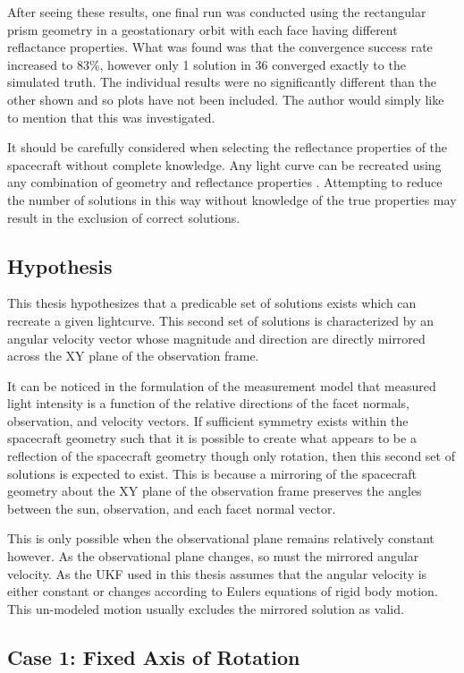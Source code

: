After seeing these results, one final run was conducted using the rectangular prism geometry in a geostationary orbit with each face having different reflactance properties. What was found was that the convergence success rate increased to 83\%, however only 1 solution in 36 converged exactly to the simulated truth. The individual results were no significantly different than the other shown and so plots have not been included. The author would simply like to mention that this was investigated.

It should be carefully considered when selecting the reflectance properties of the spacecraft without complete knowledge. Any light curve can be recreated using any combination of geometry and reflectance properties \cite{Spin_Direction}. Attempting to reduce the number of solutions in this way without knowledge of the true properties may result in the exclusion of correct solutions.

\subsection{Hypothesis}

This thesis hypothesizes that a predicable set of solutions exists which can recreate a given lightcurve. This second set of solutions is characterized by an angular velocity vector whose magnitude and direction are directly mirrored across the XY plane of the observation frame.

It can be noticed in the formulation of the measurement model that measured light intensity is a function of the relative directions of the facet normals, observation, and velocity vectors. If sufficient symmetry exists within the spacecraft geometry such that it is possible to create what appears to be a reflection of the spacecraft geometry though only rotation, then this second set of solutions is expected to exist. This is because a mirroring of the spacecraft geometry about the XY plane of the observation frame preserves the angles between the sun, observation, and each facet normal vector.

This is only possible when the observational plane remains relatively constant however. As the observational plane changes, so must the mirrored angular velocity. As the UKF used in this thesis assumes that the angular velocity is either constant or changes according to Eulers equations of rigid body motion. This un-modeled motion usually excludes the mirrored solution as valid.


\subsection{Case 1: Fixed Axis of Rotation}

